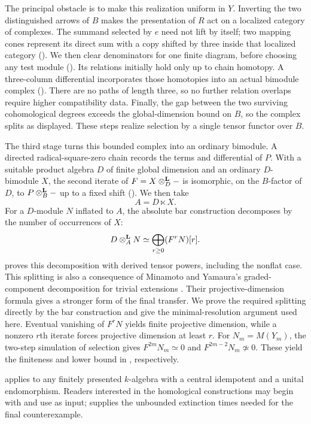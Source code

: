 The principal obstacle is to make this realization uniform in \(Y\).
Inverting the two distinguished arrows of \(B\) makes the presentation
of \(R\) act on a localized category of complexes. The summand selected
by \(e\) need not lift by itself; two mapping cones represent its
direct sum with a copy shifted by three inside that localized category
().
We then clear denominators for one finite diagram, before choosing any
test module (). Its relations initially hold only
up to chain homotopy. A three-column differential incorporates those
homotopies into an actual bimodule complex ().
There are no paths of length three, so no further relation overlaps
require higher compatibility data. Finally, the gap between the two
surviving cohomological degrees exceeds the global-dimension bound on
\(B\), so the complex splits as displayed. These steps realize selection
by a single tensor functor over \(B\).

The third stage turns this bounded complex into an ordinary
bimodule.  A directed radical-square-zero chain records the terms
and differential of \(P\).  With a suitable product algebra \(D\)
of finite global dimension and an ordinary \(D\)-bimodule \(X\),
the second iterate of \(F=X\otimes^{\mathbf L}_D-\) is isomorphic, on the
\(B\)-factor of \(D\), to \(P\otimes^{\mathbf L}_B-\) up to a fixed shift
().  We then take
\[
A=D\ltimes X.
\]
For a \(D\)-module \(N\) inflated to \(A\), the absolute bar
construction decomposes by the number of occurrences of \(X\):
\[
D\otimes^{\mathbf L}_A N\simeq\bigoplus_{r\ge0}(F^rN)[r].
\]
 proves this decomposition with derived
tensor powers, including the nonflat case. This splitting is also a
consequence of Minamoto and Yamaura's graded-component decomposition
for trivial extensions
\cite[Lemma~4.13(4) and the proof of Theorem~4.17]{MinamotoYamaura}.
Their projective-dimension formula gives a stronger form of the final
transfer. We prove the required splitting directly by the bar construction
and give the minimal-resolution argument used here.
Eventual vanishing of \(F^rN\) yields finite projective dimension,
while a nonzero \(r\)th iterate forces projective dimension at
least \(r\). For \(N_m=M(Y_m)\), the two-step simulation of selection
gives \(F^{2m}N_m\simeq0\) and \(F^{2m-2}N_m\not\simeq0\).
These yield the finiteness and lower bound in , respectively.

 applies to any finitely presented
\(k\)-algebra with a central idempotent and a unital endomorphism.
Readers interested in the homological constructions may begin with
 and use  as input;
 supplies the unbounded extinction times needed
for the final counterexample.

